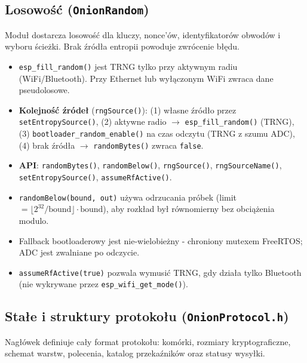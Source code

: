 \documentclass[thesis=inz,faculty=ee]{EE-dyplom}
\begin{document}
    \subsection{Losowość (\texttt{OnionRandom})}

    Moduł dostarcza losowość dla kluczy, nonce'ów, identyfikatorów obwodów i wyboru ścieżki. Brak źródła entropii powoduje zwrócenie błędu.

    \begin{itemize}
        \item \texttt{esp\_fill\_random()} jest TRNG tylko przy aktywnym radiu (WiFi/Bluetooth). Przy Ethernet lub wyłączonym WiFi zwraca dane pseudolosowe.
        \item \textbf{Kolejność źródeł} (\texttt{rngSource()}): (1) własne źródło przez \texttt{setEntropySource()}, (2) aktywne radio \(\rightarrow\) 
        \texttt{esp\_fill\_random()} (TRNG), (3) \texttt{bootloader\_random\_enable()} na czas odczytu (TRNG z szumu ADC), (4) brak źródła 
        \(\rightarrow\) \texttt{randomBytes()} zwraca \texttt{false}.
        \item \textbf{API}: \texttt{randomBytes()}, \texttt{randomBelow()}, \texttt{rngSource()}, \texttt{rngSourceName()}, \texttt{setEntropySource()}, 
        \texttt{assumeRfActive()}.
        \item \texttt{randomBelow(bound, out)} używa odrzucania próbek (limit \(=\lfloor 2^{32}/\text{bound}\rfloor\cdot\text{bound}\)), aby rozkład był 
        równomierny bez obciążenia modulo.
        \item Fallback bootloaderowy jest nie-wielobieżny - chroniony mutexem FreeRTOS; ADC jest zwalniane po odczycie.
        \item \texttt{assumeRfActive(true)} pozwala wymusić TRNG, gdy działa tylko Bluetooth (nie wykrywane przez \texttt{esp\_wifi\_get\_mode()}).
    \end{itemize}

    \subsection{Stałe i struktury protokołu (\texttt{OnionProtocol.h})}

    Nagłówek definiuje cały format protokołu: komórki, rozmiary kryptograficzne, schemat warstw, polecenia, katalog przekaźników oraz statusy wysyłki.
\end{document}
